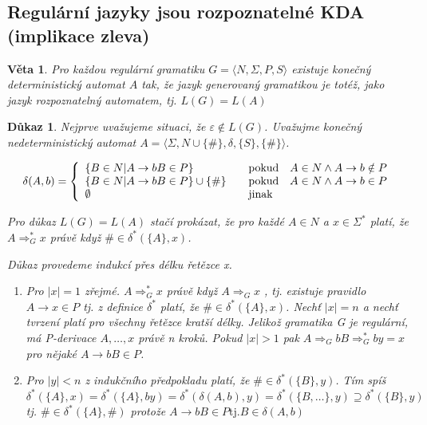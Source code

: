 \documentclass[10pt, a4paper, titlepage]{article}
\theoremstyle{note}
\newtheorem{veta}{Věta}
\newtheorem{dukaz}{Důkaz}
\begin{document}
\subsection{Regulární jazyky jsou rozpoznatelné KDA (implikace zleva)}

\begin{veta}
Pro každou regulární gramatiku $G=\langle N,\Sigma,P,S \rangle$ existuje konečný deterministický automat $A$ tak, že jazyk generovaný gramatikou je totéž, jako jazyk rozpoznatelný automatem, tj. $L(G)=L(A)$
\end{veta} 

\begin{dukaz}
Nejprve uvažujeme situaci, že $\varepsilon \notin L(G)$. Uvažujme konečný nedeterministický automat $A = \langle \Sigma, N \cup \lbrace \# \rbrace, \delta, \lbrace S \rbrace,\lbrace \# \rbrace \rangle$.

$$
\delta(A,b)=\left\{
\begin{array}{l@{\quad\mbox{}\quad}l}
\lbrace B \in N | A \rightarrow bB \in P \rbrace & \text{pokud}\quad A \in N \wedge A \rightarrow b \notin P\\
\lbrace B \in N | A \rightarrow bB \in P \rbrace \cup \lbrace \# \rbrace & \text{pokud}\quad A \in N \wedge A \rightarrow b \in P\\
\emptyset & \text{jinak}\\
\end{array}
\right.
$$

Pro důkaz $L(G)=L(A)$ stačí prokázat, že pro každé $A \in N $  a $ x \in \Sigma^* $ platí, že $A \Rightarrow_G^* x$ právě když $ \# \in \delta^* (\lbrace A \rbrace,x)$.

Důkaz provedeme indukcí přes délku řetězce x. 
\begin{enumerate}
\item
Pro $|x|=1$ zřejmé. $A \Rightarrow_G^* x $ právě když $A \Rightarrow_G x $ , tj. existuje pravidlo $A \rightarrow x \in P$ tj. z definice $\delta^*$ platí, že $ \#\in \delta^* (\lbrace A \rbrace, x) $.
Nechť $|x|=n$ a nechť tvrzení platí pro všechny řetězce kratší délky. Jelikož gramatika G je regulární, má P-derivace $A,\ldots,x$ právě n kroků. Pokud $|x|>1$ pak $ A \Rightarrow_G bB \Rightarrow_G^* by = x $ pro nějaké $ A \rightarrow bB \in P$.

\item
Pro $|y|<n$ z indukčního předpokladu platí, že $\#\in \delta^* (\lbrace B \rbrace,y)$.
Tím spíš $\delta^* ( \lbrace A \rbrace, x ) = \delta^* ( \lbrace A \rbrace, by ) = \delta^* ( \delta( A , b ),y) = \delta^* ( \lbrace B,\ldots \rbrace, y ) \supseteq \delta^* ( \lbrace B \rbrace, y )$ tj. $ \# \in \delta^* (\lbrace A \rbrace,\#)$ protože $A \rightarrow bB \in P \text{tj.} B\in\delta (A,b)$


\end{enumerate}
\end{dukaz}
\end{document}
